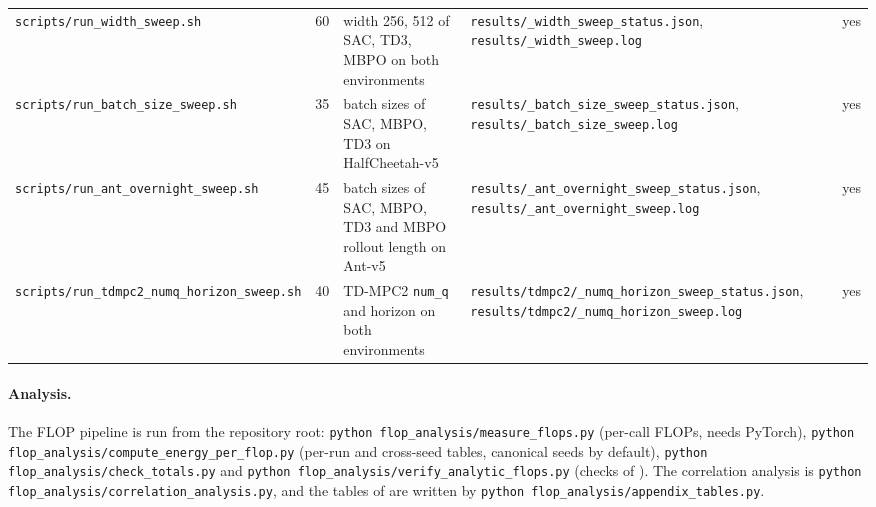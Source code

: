 \begin{table}[tbp]
{\begin{tabular}{@{}p{4.6cm}rp{5.2cm}p{5.6cm}c@{}}
      \texttt{scripts/\allowbreak run\_\allowbreak width\_\allowbreak sweep.sh} & \num{60} & width \num{256}, \num{512} of SAC, TD3, MBPO on both environments & \texttt{results/\allowbreak \_\allowbreak width\_\allowbreak sweep\_\allowbreak status.json}, \texttt{results/\allowbreak \_\allowbreak width\_\allowbreak sweep.log} & yes \\
      \texttt{scripts/\allowbreak run\_\allowbreak batch\_\allowbreak size\_\allowbreak sweep.sh} & \num{35} & batch sizes of SAC, MBPO, TD3 on HalfCheetah-v5 & \texttt{results/\allowbreak \_\allowbreak batch\_\allowbreak size\_\allowbreak sweep\_\allowbreak status.json}, \texttt{results/\allowbreak \_\allowbreak batch\_\allowbreak size\_\allowbreak sweep.log} & yes \\
      \texttt{scripts/\allowbreak run\_\allowbreak ant\_\allowbreak overnight\_\allowbreak sweep.sh} & \num{45} & batch sizes of SAC, MBPO, TD3 and MBPO rollout length on Ant-v5 & \texttt{results/\allowbreak \_\allowbreak ant\_\allowbreak overnight\_\allowbreak sweep\_\allowbreak status.json}, \texttt{results/\allowbreak \_\allowbreak ant\_\allowbreak overnight\_\allowbreak sweep.log} & yes \\
      \texttt{scripts/\allowbreak run\_\allowbreak tdmpc2\_\allowbreak numq\_\allowbreak horizon\_\allowbreak sweep.sh} & \num{40} & TD-MPC2 \texttt{num\_\allowbreak q} and horizon on both environments & \texttt{results/\allowbreak tdmpc2/\allowbreak \_\allowbreak numq\_\allowbreak horizon\_\allowbreak sweep\_\allowbreak status.json}, \texttt{results/\allowbreak tdmpc2/\allowbreak \_\allowbreak numq\_\allowbreak horizon\_\allowbreak sweep.log} & yes \\
      \bottomrule
    \end{tabular}}
\end{table}

\paragraph{Analysis.} The FLOP pipeline is run from the repository root: \texttt{python flop\_\allowbreak analysis/\allowbreak measure\_\allowbreak flops.py} (per-call FLOPs, needs PyTorch), \texttt{python flop\_\allowbreak analysis/\allowbreak compute\_\allowbreak energy\_\allowbreak per\_\allowbreak flop.py} (per-run and cross-seed tables, canonical seeds by default), \texttt{python flop\_\allowbreak analysis/\allowbreak check\_\allowbreak totals.py} and \texttt{python flop\_\allowbreak analysis/\allowbreak verify\_\allowbreak analytic\_\allowbreak flops.py} (checks of ).
The correlation analysis is \texttt{python flop\_\allowbreak analysis/\allowbreak correlation\_\allowbreak analysis.py}, and the tables of  are written by \texttt{python flop\_\allowbreak analysis/\allowbreak appendix\_\allowbreak tables.py}.

